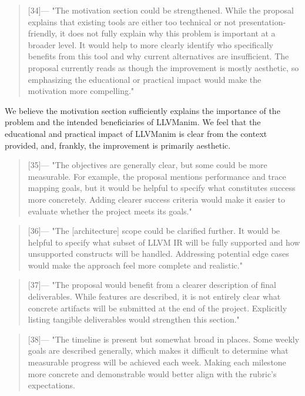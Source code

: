 \begin{quotation} [34]---%
  "The motivation section could be strengthened. While the proposal explains that existing tools are either too technical or not presentation-friendly, it does not fully explain why this problem is important at a broader level. It would help to more clearly identify who specifically benefits from this tool and why current alternatives are insufficient. The proposal currently reads as though the improvement is mostly aesthetic, so emphasizing the educational or practical impact would make the motivation more compelling."
\end{quotation}
\noindent We believe the motivation section sufficiently explains the importance of the problem and the intended beneficiaries of LLVManim. We feel that the educational and practical impact of LLVManim is clear from the context provided, and, frankly, the improvement is primarily aesthetic.

\begin{quotation} [35]---%
  "The objectives are generally clear, but some could be more measurable. For example, the proposal mentions performance and trace mapping goals, but it would be helpful to specify what constitutes success more concretely. Adding clearer success criteria would make it easier to evaluate whether the project meets its goals."
\end{quotation}

\begin{quotation} [36]---%
  "The [architecture] scope could be clarified further. It would be helpful to specify what subset of LLVM IR will be fully supported and how unsupported constructs will be handled. Addressing potential edge cases would make the approach feel more complete and realistic."
\end{quotation}

\begin{quotation} [37]---%
  "The proposal would benefit from a clearer description of final deliverables. While features are described, it is not entirely clear what concrete artifacts will be submitted at the end of the project. Explicitly listing tangible deliverables would strengthen this section."
\end{quotation}

\begin{quotation} [38]---%
  "The timeline is present but somewhat broad in places. Some weekly goals are described generally, which makes it difficult to determine what measurable progress will be achieved each week. Making each milestone more concrete and demonstrable would better align with the rubric’s expectations.
\end{quotation}

